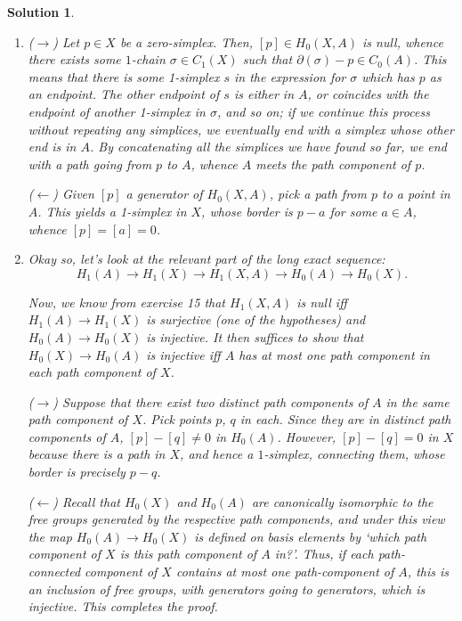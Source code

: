 \documentclass{article}
\theoremstyle{plain}
\theoremstyle{nonumberplain}
\newtheorem{sol}{Solution}
\begin{document}
\begin{sol}
\leavevmode
\begin{enumerate}
\item ($\rightarrow$) Let $p \in X$ be a zero-simplex. Then, $[p] \in H_0(X,A)$ is null, whence there exists some $1$-chain $\sigma \in C_1(X)$ such that $\partial(\sigma) - p \in C_0(A)$. This means that there is some 1-simplex $s$ in the expression for $\sigma$ which has $p$ as an endpoint. The other endpoint of $s$ is either in $A$, or coincides with the endpoint of another 1-simplex in $\sigma$, and so on; if we continue this process without repeating any simplices, we eventually end with a simplex whose other end is in $A$. By concatenating all the simplices we have found so far, we end with a path going from $p$ to $A$, whence $A$ meets the path component of $p$.

($\leftarrow$) Given $[p]$ a generator of $H_0(X,A)$, pick a path from $p$ to a point in $A$. This yields a 1-simplex in $X$, whose border is $p-a$ for some $a \in A$, whence $[p] = [a] = 0$.

\item Okay so, let's look at the relevant part of the long exact sequence:
\begin{equation}
H_1(A) \to H_1(X) \to H_1(X,A) \to H_0(A) \to H_0(X).
\end{equation}

Now, we know from exercise 15 that $H_1(X,A)$ is null iff $H_1(A) \to H_1(X)$ is surjective (one of the hypotheses) and $H_0(A) \to H_0(X)$ is injective. It then suffices to show that $H_0(X) \to H_0(A)$ is injective iff $A$ has at most one path component in each path component of $X$.

($\rightarrow$) Suppose that there exist two distinct path components of $A$ in the same path component of $X$. Pick points $p$, $q$ in each. Since they are in distinct path components of $A$, $[p] - [q] \neq 0$ in $H_0(A)$. However, $[p] - [q] = 0$ in $X$ because there is a path in $X$, and hence a $1$-simplex, connecting them, whose border is precisely $p-q$.

($\leftarrow$) Recall that $H_0(X)$ and $H_0(A)$ are canonically isomorphic to the free groups generated by the respective path components, and under this view the map $H_0(A) \to H_0(X)$ is defined on basis elements by `which path component of $X$ is this path component of $A$ in?'. Thus, if each path-connected component of $X$ contains at most one path-component of $A$, this is an inclusion of free groups, with generators going to generators, which is injective. This completes the proof.
\end{enumerate}
\end{sol}
\end{document}
